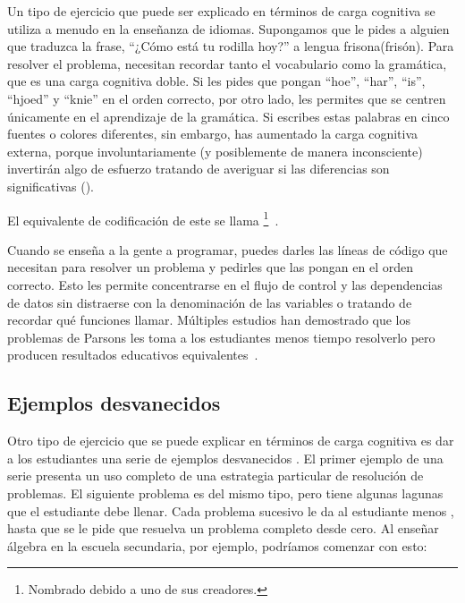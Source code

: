 Un tipo de ejercicio que puede ser explicado en términos de carga cognitiva 
se utiliza a menudo en la enseñanza de idiomas.
Supongamos que le pides a alguien que traduzca la frase, 
``¿Cómo está tu rodilla hoy?'' a lengua frisona(frisón).
Para resolver el problema, necesitan recordar tanto el vocabulario 
como la gramática, que es una carga cognitiva doble.
Si les pides que pongan ``hoe'', ``har'', ``is'', ``hjoed'' y ``knie'' en el orden correcto, 
por otro lado, les permites que se centren únicamente en el aprendizaje de la gramática.
Si escribes estas palabras en cinco fuentes o colores diferentes, 
sin embargo, has aumentado la carga cognitiva externa, porque involuntariamente 
(y posiblemente de manera inconsciente) invertirán algo de esfuerzo tratando de averiguar 
si las diferencias son significativas ().


El equivalente de codificación de este
se llama \footnote{Nombrado debido a uno de sus creadores.}~\cite{Pars2006}.

Cuando se enseña a la gente a programar,
puedes darles las líneas de código que necesitan para resolver un problema
y pedirles que las pongan en el orden correcto.
Esto les permite concentrarse en el flujo de control y las dependencias de datos
sin distraerse con la denominación de las variables o tratando de recordar qué funciones llamar.
Múltiples estudios han demostrado que los problemas de Parsons les toma a los estudiantes menos tiempo resolverlo
pero producen resultados educativos equivalentes~\cite{Eric2017}.


\subsection*{Ejemplos desvanecidos}

Otro tipo de ejercicio que se puede explicar en términos de carga cognitiva 
es dar a los estudiantes una serie de ejemplos desvanecidos .
El primer ejemplo de una serie presenta un uso completo de una estrategia 
particular de resolución de problemas. 
El siguiente problema es del mismo tipo, 
pero tiene algunas lagunas que el estudiante debe llenar. 
Cada problema sucesivo le da al estudiante menos ,
hasta que se le pide que resuelva un problema completo desde cero. 
Al enseñar álgebra en la escuela secundaria, 
por ejemplo, 
podríamos comenzar con esto:



